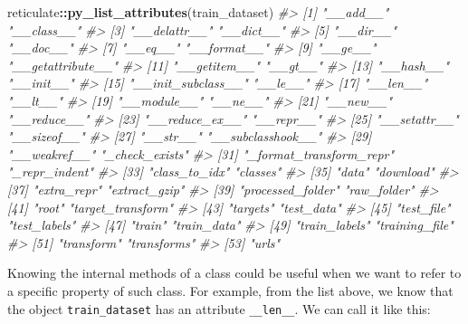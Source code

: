 \documentclass[]{book}
\newenvironment{Shaded}{\begin{snugshade}}{\end{snugshade}}
\newcommand{\CommentTok}[1]{\textcolor[rgb]{0.56,0.35,0.01}{\textit{#1}}}
\newcommand{\DataTypeTok}[1]{\textcolor[rgb]{0.13,0.29,0.53}{#1}}
\newcommand{\KeywordTok}[1]{\textcolor[rgb]{0.13,0.29,0.53}{\textbf{#1}}}
\newcommand{\NormalTok}[1]{#1}
\newcommand{\OperatorTok}[1]{\textcolor[rgb]{0.81,0.36,0.00}{\textbf{#1}}}
\newcommand{\StringTok}[1]{\textcolor[rgb]{0.31,0.60,0.02}{#1}}
\begin{document}
\begin{Shaded}
\begin{Highlighting}[]
\NormalTok{reticulate}\OperatorTok{::}\KeywordTok{py_list_attributes}\NormalTok{(train_dataset)}
\CommentTok{#>  [1] "__add__"                "__class__"             }
\CommentTok{#>  [3] "__delattr__"            "__dict__"              }
\CommentTok{#>  [5] "__dir__"                "__doc__"               }
\CommentTok{#>  [7] "__eq__"                 "__format__"            }
\CommentTok{#>  [9] "__ge__"                 "__getattribute__"      }
\CommentTok{#> [11] "__getitem__"            "__gt__"                }
\CommentTok{#> [13] "__hash__"               "__init__"              }
\CommentTok{#> [15] "__init_subclass__"      "__le__"                }
\CommentTok{#> [17] "__len__"                "__lt__"                }
\CommentTok{#> [19] "__module__"             "__ne__"                }
\CommentTok{#> [21] "__new__"                "__reduce__"            }
\CommentTok{#> [23] "__reduce_ex__"          "__repr__"              }
\CommentTok{#> [25] "__setattr__"            "__sizeof__"            }
\CommentTok{#> [27] "__str__"                "__subclasshook__"      }
\CommentTok{#> [29] "__weakref__"            "_check_exists"         }
\CommentTok{#> [31] "_format_transform_repr" "_repr_indent"          }
\CommentTok{#> [33] "class_to_idx"           "classes"               }
\CommentTok{#> [35] "data"                   "download"              }
\CommentTok{#> [37] "extra_repr"             "extract_gzip"          }
\CommentTok{#> [39] "processed_folder"       "raw_folder"            }
\CommentTok{#> [41] "root"                   "target_transform"      }
\CommentTok{#> [43] "targets"                "test_data"             }
\CommentTok{#> [45] "test_file"              "test_labels"           }
\CommentTok{#> [47] "train"                  "train_data"            }
\CommentTok{#> [49] "train_labels"           "training_file"         }
\CommentTok{#> [51] "transform"              "transforms"            }
\CommentTok{#> [53] "urls"}
\end{Highlighting}
\end{Shaded}

Knowing the internal methods of a class could be useful when we want to refer to a specific property of such class. For example, from the list above, we know that the object \texttt{train\_dataset} has an attribute \texttt{\_\_len\_\_}. We can call it like this:

\begin{Shaded}
\end{Shaded}
\end{document}
